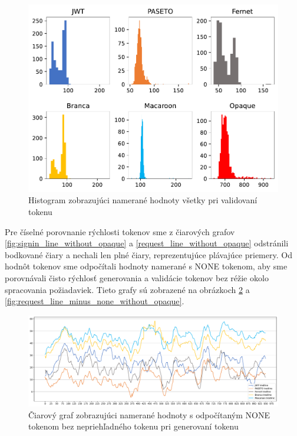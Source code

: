 \begin{figure}
  \centerline{\includegraphics[width=1\textwidth]{images/request_histogram_all}}
  \caption[Histogram -- validácia, všetky hodnoty]{Histogram zobrazujúci namerané hodnoty všetky pri validovaní tokenu}
  \label{fig:request_histogram_all}
\end{figure}

Pre číselné porovnanie rýchlosti tokenov sme z čiarových grafov \ref{fig:signin_line_without_opaque} a \ref{request_line_without_opaque} odstránili bodkované čiary a nechali len plné čiary, reprezentujúce plávajúce priemery. Od hodnôt tokenov sme odpočítali hodnoty namerané s NONE tokenom, aby sme porovnávali čisto rýchlosť generovania a validácie tokenov bez réžie okolo spracovania požiadaviek. Tieto grafy sú zobrazené na obrázkoch \ref{fig:signin_line_minus_none_without_opaque} a \ref{fig:request_line_minus_none_without_opaque}.

\begin{figure}
  \centerline{\includegraphics[width=1\textwidth]{images/signin_line_minus_none_without_opaque}}
  \caption[Čiarový graf -- generovanie, odpočítaný NONE token]{Čiarový graf zobrazujúci namerané hodnoty s odpočítaným NONE tokenom bez nepriehľadného tokenu pri generovaní tokenu}
  \label{fig:signin_line_minus_none_without_opaque}
\end{figure}

